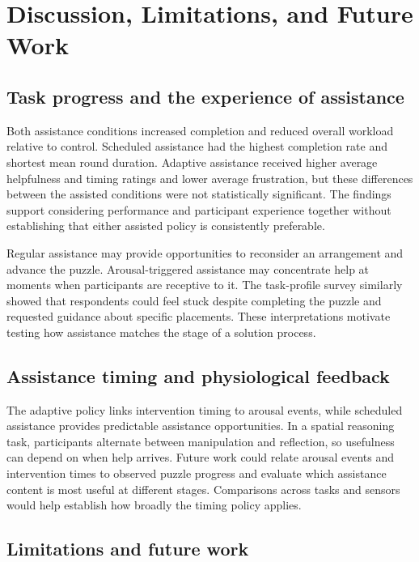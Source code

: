 \documentclass[sigconf,anonymous,balance=false]{aamas} %
\begin{document}
\section{Discussion, Limitations, and Future Work}

\subsection{Task progress and the experience of assistance}

Both assistance conditions increased completion and reduced overall workload relative to control. Scheduled assistance had the highest completion rate and shortest mean round duration. Adaptive assistance received higher average helpfulness and timing ratings and lower average frustration, but these differences between the assisted conditions were not statistically significant. The findings support considering performance and participant experience together without establishing that either assisted policy is consistently preferable.

Regular assistance may provide opportunities to reconsider an arrangement and advance the puzzle. Arousal-triggered assistance may concentrate help at moments when participants are receptive to it. The task-profile survey similarly showed that respondents could feel stuck despite completing the puzzle and requested guidance about specific placements. These interpretations motivate testing how assistance matches the stage of a solution process.

\subsection{Assistance timing and physiological feedback}

The adaptive policy links intervention timing to arousal events, while scheduled assistance provides predictable assistance opportunities. In a spatial reasoning task, participants alternate between manipulation and reflection, so usefulness can depend on when help arrives. Future work could relate arousal events and intervention times to observed puzzle progress and evaluate which assistance content is most useful at different stages. Comparisons across tasks and sensors would help establish how broadly the timing policy applies.

\subsection{Limitations and future work}
\end{document}
